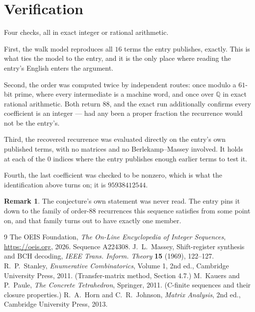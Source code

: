 \documentclass[11pt,a4paper]{article}
\theoremstyle{plain}
\theoremstyle{definition}
\newtheorem{remark}[theorem]{Remark}
\begin{document}
\section{Verification}

Four checks, all in exact integer or rational arithmetic.

First, the walk model reproduces all $16$ terms the entry publishes, exactly. This is
what ties the model to the entry, and it is the only place where reading the entry's English
enters the argument.

Second, the order was computed twice by independent routes: once modulo a $61$-bit prime, where
every intermediate is a machine word, and once over $\mathbb{Q}$ in exact rational arithmetic.
Both return $88$, and the exact run additionally confirms every coefficient is an integer
--- had any been a proper fraction the recurrence would not be the entry's.

Third, the recovered recurrence was evaluated directly on the entry's own published terms, with
no matrices and no Berlekamp--Massey involved. It holds at each of the $0$ indices where
the entry publishes enough earlier terms to test it.

Fourth, the last coefficient was checked to be nonzero, which is what the identification above
turns on; it is $95938412544$.

\begin{remark}
The conjecture's own statement was never read. The entry pins it down to the family of
order-$88$ recurrences this sequence satisfies from some point on, and that family turns
out to have exactly one member.
\end{remark}

\begin{thebibliography}{9}
 The OEIS Foundation, \emph{The On-Line Encyclopedia of Integer
Sequences}, \url{https://oeis.org}, 2026. Sequence A224308.
 J.~L.~Massey, Shift-register synthesis and BCH decoding, \emph{IEEE
Trans. Inform. Theory} \textbf{15} (1969), 122--127.
 R.~P.~Stanley, \emph{Enumerative Combinatorics}, Volume 1, 2nd ed.,
Cambridge University Press, 2011. (Transfer-matrix method, Section 4.7.)
 M.~Kauers and P.~Paule, \emph{The Concrete Tetrahedron}, Springer, 2011.
(C-finite sequences and their closure properties.)
 R.~A.~Horn and C.~R.~Johnson, \emph{Matrix Analysis}, 2nd ed., Cambridge
University Press, 2013.
\end{thebibliography}
\end{document}

